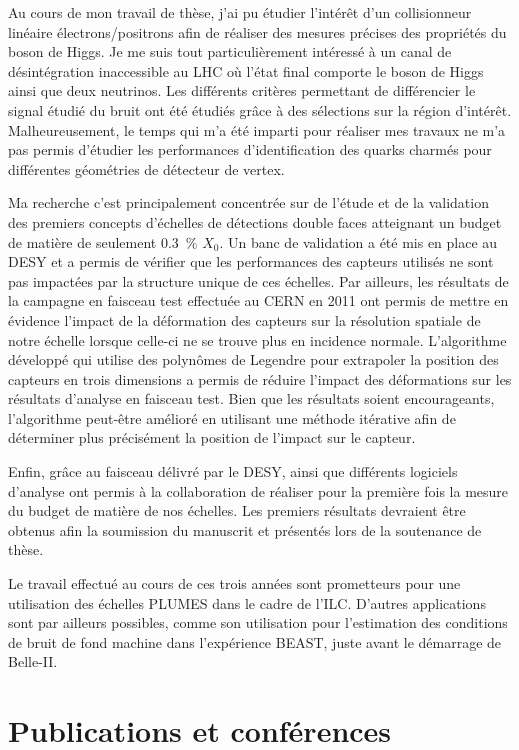   Au cours de mon travail de thèse, j'ai pu étudier l'intérêt d'un collisionneur linéaire électrons/positrons afin de réaliser des mesures précises des propriétés du boson de Higgs.
  Je me suis tout particulièrement intéressé à un canal de désintégration inaccessible au LHC où l'état final comporte le boson de Higgs ainsi que deux neutrinos. 
  Les différents critères permettant de différencier le signal étudié du bruit ont été étudiés grâce à des sélections sur la région d'intérêt.
  Malheureusement, le temps qui m'a été imparti pour réaliser mes travaux ne m'a pas permis d'étudier les performances d'identification des quarks charmés pour différentes géométries de détecteur de vertex.

  Ma recherche c'est principalement concentrée sur de l'étude et de la validation des premiers concepts d'échelles de détections double faces atteignant un budget de matière de seulement 0.3~\% $X_0$.
  Un banc de validation a été mis en place au DESY et a permis de vérifier que les performances des capteurs utilisés ne sont pas impactées par la structure unique de ces échelles.
  Par ailleurs, les résultats de la campagne en faisceau test effectuée au CERN en 2011 ont permis de mettre en évidence l'impact de la déformation des capteurs sur la résolution spatiale de notre échelle lorsque celle-ci ne se trouve plus en incidence normale.
  L'algorithme développé qui utilise des polynômes de Legendre pour extrapoler la position des capteurs en trois dimensions a permis de réduire l'impact des déformations sur les résultats d'analyse en faisceau test.
  Bien que les résultats soient encourageants, l'algorithme peut-être amélioré en utilisant une méthode itérative afin de déterminer plus précisément la position de l'impact sur le capteur.
  
  Enfin, grâce au faisceau délivré par le DESY, ainsi que différents logiciels d'analyse ont permis à la collaboration de réaliser pour la première fois la mesure du budget de matière de nos échelles.
  Les premiers résultats devraient être obtenus afin la soumission du manuscrit et présentés lors de la soutenance de thèse.

  Le travail effectué au cours de ces trois années sont prometteurs pour une utilisation des échelles PLUMES dans le cadre de l'ILC.
  D'autres applications sont par ailleurs possibles, comme son utilisation pour l'estimation des conditions de bruit de fond machine dans l'expérience BEAST, juste avant le démarrage de Belle-II.

  \section*{Publications et conférences}

